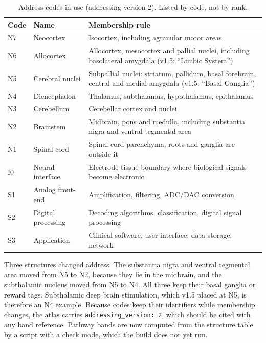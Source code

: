 \begin{table}[H]
\centering
\caption{Address codes in use (addressing version 2). Listed by code, not by rank.}
\label{tab:bands}
\small
\begin{tabularx}{\textwidth}{@{}l l X@{}}
\toprule
\textbf{Code} & \textbf{Name} & \textbf{Membership rule} \\
\midrule
N7 & Neocortex       & Isocortex, including agranular motor areas \\
N6 & Allocortex      & Allocortex, mesocortex and pallial nuclei, including basolateral amygdala (v1.5: ``Limbic System'') \\
N5 & Cerebral nuclei & Subpallial nuclei: striatum, pallidum, basal forebrain, central and medial amygdala (v1.5: ``Basal Ganglia'') \\
N4 & Diencephalon    & Thalamus, subthalamus, hypothalamus, epithalamus \\
N3 & Cerebellum      & Cerebellar cortex and nuclei \\
N2 & Brainstem       & Midbrain, pons and medulla, including substantia nigra and ventral tegmental area \\
N1 & Spinal cord     & Spinal cord parenchyma; roots and ganglia are outside it \\
\midrule
I0 & Neural interface & Electrode-tissue boundary where biological signals become electronic \\
\midrule
S1 & Analog front-end   & Amplification, filtering, ADC/DAC conversion \\
S2 & Digital processing & Decoding algorithms, classification, digital signal processing \\
S3 & Application        & Clinical software, user interface, data storage, network \\
\bottomrule
\end{tabularx}
\end{table}

Three structures changed address. The substantia nigra and ventral tegmental area moved
from N5 to N2, because they lie in the midbrain, and the subthalamic nucleus moved from N5
to N4. All three keep their basal ganglia or reward tags. Subthalamic deep brain
stimulation, which v1.5 placed at N5, is therefore an N4 example. Because codes keep their
identifiers while membership changes, the atlas carries \texttt{addressing\_version: 2},
which should be cited with any band reference. Pathway bands are now computed from the
structure table by a script with a check mode, which the build does not yet run.

